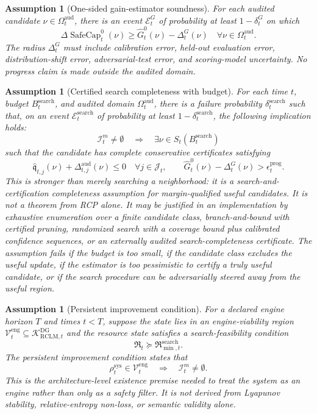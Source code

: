 \documentclass[11pt,a4paper]{article}
\newtheorem{assumption}[theorem]{Assumption}
\newcommand{\Kcal}{\mathcal K}
\newcommand{\Vcal}{\mathcal V}
\newcommand{\Ecal}{\mathcal E}
\newcommand{\RCLM}{\mathrm{RCLM}}
\newcommand{\DG}{\mathrm{DG}}
\newcommand{\sys}{\mathrm{sys}}
\newcommand{\aud}{\mathrm{aud}}
\newcommand{\SafeCap}{\operatorname{SafeCap}}
\newcommand{\search}{\mathrm{search}}
\begin{document}
\begin{assumption}[One-sided gain-estimator soundness]
\label{ass:one-sided-gain-estimator-soundness}
For each audited candidate \(\nu\in\Omega_t^{\aud}\), there is an event \(\Ecal_t^{G}\) of probability at least \(1-\delta_t^G\) on which
\[
\Delta\SafeCap_t^{0}(\nu)
\ge
\widehat G_t^{0}(\nu)-\Delta_t^{G}(\nu)
\quad
\forall \nu\in\Omega_t^{\aud}.
\]
The radius \(\Delta_t^G\) must include calibration error, held-out evaluation error, distribution-shift error, adversarial-test error, and scoring-model uncertainty.  No progress claim is made outside the audited domain.
\end{assumption}

\begin{assumption}[Certified search completeness with budget]
\label{ass:certified-search-completeness-budget}
For each time \(t\), budget \(B_t^{\search}\), and audited domain \(\Omega_t^{\aud}\), there is a failure probability \(\delta_t^{\search}\) such that, on an event \(\Ecal_t^{\search}\) of probability at least \(1-\delta_t^{\search}\), the following implication holds:
\[
\mathcal I_t^{m}\neq\emptyset
\quad\Longrightarrow\quad
\exists \nu\in S_t(B_t^{\search})
\]
such that the candidate has complete conservative certificates satisfying
\[
\widehat{\mathfrak q}_{t,j}(\nu)+\Delta_{t,j}^{\aud}(\nu)\le0
\quad\forall j\in\mathcal J_t,
\qquad
\widehat G_t^{0}(\nu)-\Delta_t^{G}(\nu)>
\epsilon_t^{\mathrm{prog}}.
\]
This is stronger than merely searching a neighborhood: it is a search-and-certification completeness assumption for margin-qualified useful candidates.  It is not a theorem from RCP alone.  It may be justified in an implementation by exhaustive enumeration over a finite candidate class, branch-and-bound with certified pruning, randomized search with a coverage bound plus calibrated confidence sequences, or an externally audited search-completeness certificate.  The assumption fails if the budget is too small, if the candidate class excludes the useful update, if the estimator is too pessimistic to certify a truly useful candidate, or if the search procedure can be adversarially steered away from the useful region.
\end{assumption}

\begin{assumption}[Persistent improvement condition]
\label{ass:persistent-improvement-condition-rclm}
For a declared engine horizon \(T\) and times \(t<T\), suppose the state lies in an engine-viability region \(\Vcal_t^{\mathrm{eng}}\subseteq\Kcal_{\RCLM,t}^{\DG}\) and the resource state satisfies a search-feasibility condition
\[
\mathfrak R_t\succeq 
\mathfrak R_{\min,t}^{\search}.
\]
The persistent improvement condition states that
\[
\rho_t^{\sys}\in\Vcal_t^{\mathrm{eng}}
\quad\Longrightarrow\quad
\mathcal I_t^{m}\neq\emptyset.
\]
This is the architecture-level existence premise needed to treat the system as an engine rather than only as a safety filter.  It is not derived from Lyapunov stability, relative-entropy non-loss, or semantic validity alone.
\end{assumption}
\end{document}
